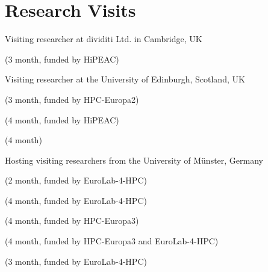 \section{Research Visits}
\begin{cvitemize}
   \item Visiting researcher at dividiti Ltd. in Cambridge, UK
      \begin{inlineItemize}
        \item {} (3 month, funded by HiPEAC)
      \end{inlineItemize}
    \item Visiting researcher at the University of Edinburgh, Scotland, UK
      \begin{inlineItemize}
        \item {} (3 month, funded by HPC-Europa2)
        \item {} (4 month, funded by HiPEAC)
        \item {} (4 month)
      \end{inlineItemize}
   \item Hosting visiting researchers from the University of Münster, Germany
      \begin{inlineItemize}
        \item {} (2 month, funded by EuroLab-4-HPC)
        \item {} (4 month, funded by EuroLab-4-HPC)
        \item {} (4 month, funded by HPC-Europa3)
        \item {} (4 month, funded by HPC-Europa3 and EuroLab-4-HPC)
        \item {} (3 month, funded by EuroLab-4-HPC)
      \end{inlineItemize}
\end{cvitemize}